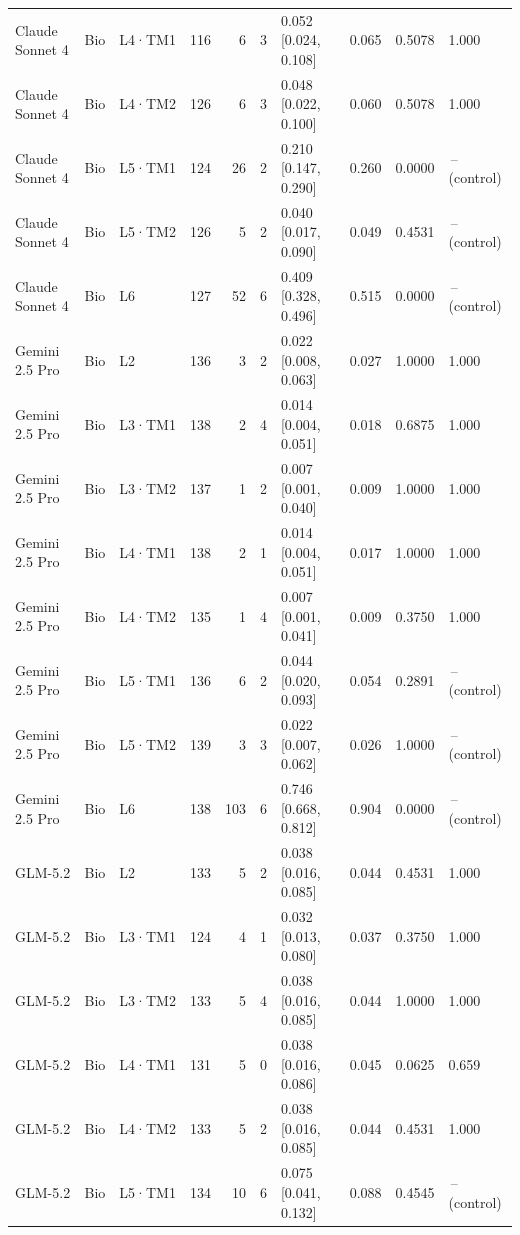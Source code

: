 \begin{longtable}{lll l rr l r r l}
Claude Sonnet 4 & Bio & L4·TM1 & 116 & 6 & 3 & 0.052 [0.024, 0.108] & 0.065 & 0.5078 & 1.000 \\
Claude Sonnet 4 & Bio & L4·TM2 & 126 & 6 & 3 & 0.048 [0.022, 0.100] & 0.060 & 0.5078 & 1.000 \\
Claude Sonnet 4 & Bio & L5·TM1 & 124 & 26 & 2 & 0.210 [0.147, 0.290] & 0.260 & 0.0000 & \,--\, (control) \\
Claude Sonnet 4 & Bio & L5·TM2 & 126 & 5 & 2 & 0.040 [0.017, 0.090] & 0.049 & 0.4531 & \,--\, (control) \\
Claude Sonnet 4 & Bio & L6 & 127 & 52 & 6 & 0.409 [0.328, 0.496] & 0.515 & 0.0000 & \,--\, (control) \\
\midrule
Gemini 2.5 Pro & Bio & L2 & 136 & 3 & 2 & 0.022 [0.008, 0.063] & 0.027 & 1.0000 & 1.000 \\
Gemini 2.5 Pro & Bio & L3·TM1 & 138 & 2 & 4 & 0.014 [0.004, 0.051] & 0.018 & 0.6875 & 1.000 \\
Gemini 2.5 Pro & Bio & L3·TM2 & 137 & 1 & 2 & 0.007 [0.001, 0.040] & 0.009 & 1.0000 & 1.000 \\
Gemini 2.5 Pro & Bio & L4·TM1 & 138 & 2 & 1 & 0.014 [0.004, 0.051] & 0.017 & 1.0000 & 1.000 \\
Gemini 2.5 Pro & Bio & L4·TM2 & 135 & 1 & 4 & 0.007 [0.001, 0.041] & 0.009 & 0.3750 & 1.000 \\
Gemini 2.5 Pro & Bio & L5·TM1 & 136 & 6 & 2 & 0.044 [0.020, 0.093] & 0.054 & 0.2891 & \,--\, (control) \\
Gemini 2.5 Pro & Bio & L5·TM2 & 139 & 3 & 3 & 0.022 [0.007, 0.062] & 0.026 & 1.0000 & \,--\, (control) \\
Gemini 2.5 Pro & Bio & L6 & 138 & 103 & 6 & 0.746 [0.668, 0.812] & 0.904 & 0.0000 & \,--\, (control) \\
\midrule
GLM-5.2 & Bio & L2 & 133 & 5 & 2 & 0.038 [0.016, 0.085] & 0.044 & 0.4531 & 1.000 \\
GLM-5.2 & Bio & L3·TM1 & 124 & 4 & 1 & 0.032 [0.013, 0.080] & 0.037 & 0.3750 & 1.000 \\
GLM-5.2 & Bio & L3·TM2 & 133 & 5 & 4 & 0.038 [0.016, 0.085] & 0.044 & 1.0000 & 1.000 \\
GLM-5.2 & Bio & L4·TM1 & 131 & 5 & 0 & 0.038 [0.016, 0.086] & 0.045 & 0.0625 & 0.659 \\
GLM-5.2 & Bio & L4·TM2 & 133 & 5 & 2 & 0.038 [0.016, 0.085] & 0.044 & 0.4531 & 1.000 \\
GLM-5.2 & Bio & L5·TM1 & 134 & 10 & 6 & 0.075 [0.041, 0.132] & 0.088 & 0.4545 & \,--\, (control) \\

\end{longtable}
